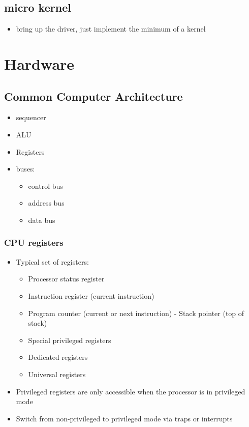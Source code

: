 \documentclass[11pt]{article}
\begin{document}
\subsection{micro kernel}
\label{sec:orgd529a03}
\begin{itemize}
\item bring up the driver, just implement the minimum of a kernel
\end{itemize}
\section{Hardware}
\label{sec:org5fb92e9}
\subsection{Common Computer Architecture}
\label{sec:org2ceae66}
\begin{itemize}
\item sequencer
\item ALU
\item Registers
\item buses:
\begin{itemize}
\item control bus
\item address bus
\item data bus
\end{itemize}
\end{itemize}
\subsubsection{CPU registers}
\label{sec:orgfc0990e}
\begin{itemize}
\item Typical set of registers:
\begin{itemize}
\item Processor status register
\item Instruction register (current instruction)
\item Program counter (current or next instruction) - Stack pointer (top of stack)
\item Special privileged registers
\item Dedicated registers
\item Universal registers
\end{itemize}
\item Privileged registers are only accessible when the processor is in privileged mode
\item Switch from non-privileged to privileged mode via traps or interrupts
\end{itemize}
\end{document}
